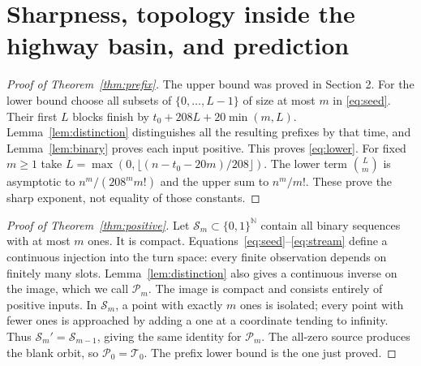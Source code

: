 \documentclass[11pt]{article}
\theoremstyle{definition}\newtheorem{definition}[theorem]{Definition}
\theoremstyle{remark}\newtheorem{remark}[theorem]{Remark}
\newcommand{\Tr}{\mathcal T}
\newcommand{\Pos}{\mathcal P}
\newcommand{\N}{\mathbb N}
\begin{document}
\section{Sharpness, topology inside the highway basin, and prediction}
\begin{proof}[Proof of Theorem~\ref{thm:prefix}]
The upper bound was proved in Section 2. For the lower bound choose all subsets
of $\{0,\ldots,L-1\}$ of size at most $m$ in \eqref{eq:seed}. Their first $L$
blocks finish by $t_0+208L+20\min(m,L)$. Lemma~\ref{lem:distinction} distinguishes
all the resulting prefixes by that time, and Lemma~\ref{lem:binary} proves each
input positive. This proves \eqref{eq:lower}. For fixed $m\ge 1$ take
$L=\max(0,\lfloor(n-t_0-20 m)/208\rfloor)$. The lower term $\binom Lm$ is
asymptotic to $n^m/(208^m m!)$ and the upper sum to $n^m/m!$. These prove the
sharp exponent, not equality of those constants.
\end{proof}

\begin{proof}[Proof of Theorem~\ref{thm:positive}]
Let $\mathcal S_m\subset\{0,1\}^{\N}$ contain all binary sequences with at
most $m$ ones. It is compact. Equations~\eqref{eq:seed}--\eqref{eq:stream}
define a continuous injection into the turn space: every finite observation
depends on finitely many slots. Lemma~\ref{lem:distinction} also gives a
continuous inverse on the image, which we call $\Pos_m$. The image is compact
and consists entirely of positive inputs. In $\mathcal S_m$, a point with
exactly $m$ ones is isolated; every point with fewer ones is approached by
adding a one at a coordinate tending to infinity. Thus
$\mathcal S_m'=\mathcal S_{m-1}$, giving the same identity for $\Pos_m$.
The all-zero source produces the blank orbit, so $\Pos_0=\Tr_0$.
The prefix lower bound is the one just proved.
\end{proof}
\end{document}
